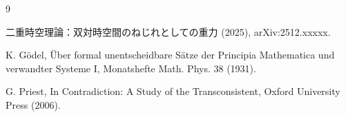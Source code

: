 \documentclass[dvipdfmx,11pt,a4paper]{article}
\theoremstyle{definition}
\begin{document}
\begin{thebibliography}{9}

二重時空理論：双対時空間のねじれとしての重力 (2025), arXiv:2512.xxxxx.

K. Gödel, Über formal unentscheidbare Sätze der Principia Mathematica und verwandter Systeme I, Monatshefte Math. Phys. 38 (1931).

G. Priest, In Contradiction: A Study of the Transconsistent, Oxford University Press (2006).

\end{thebibliography}
\end{document}
